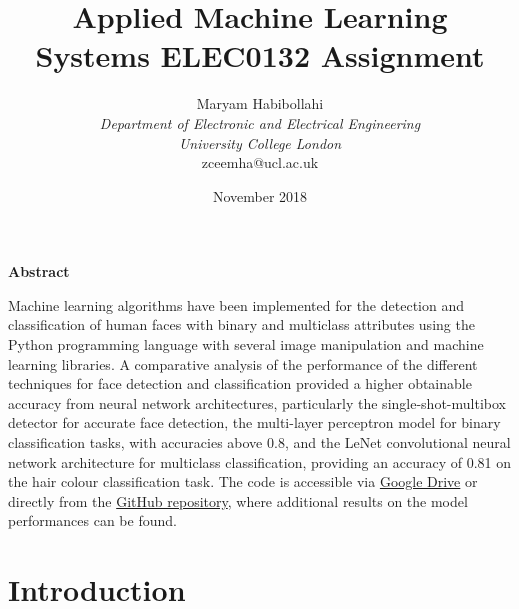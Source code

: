 \documentclass[conference]{IEEEtran}
\begin{document}
\def\code#1{\texttt{#1}}

\title{Applied Machine Learning\\
 Systems ELEC0132 Assignment}
\author{\large Maryam Habibollahi\\ \textit{Department of Electronic and Electrical Engineering}\\ \textit{University College London}\\ zceemha@ucl.ac.uk}
\date{November 2018}
\maketitle

\setcounter{page}{1} 

\begin{center} \large \textbf{Abstract} \end{center}

Machine learning algorithms have been implemented for the detection and classification of human faces with binary and multiclass attributes using the Python programming language with several image manipulation and machine learning libraries. A comparative analysis of the performance of the different techniques for face detection and classification provided a higher obtainable accuracy from neural network architectures, particularly the single-shot-multibox detector for accurate face detection, the multi-layer perceptron model for binary classification tasks, with accuracies above 0.8, and the LeNet convolutional neural network architecture for multiclass classification, providing an accuracy of 0.81 on the hair colour classification task. The code is accessible via  \href{https://drive.google.com/file/d/1WXVxgsFRLl0BnZnKn3MUFrzJA3oxCLS6/view?usp=sharing}{Google Drive} or directly from the  \href{https://github.com/maryamhb/AMLSassignment}{GitHub repository}, where additional results on the model performances can be found.

\section{Introduction} \label{s-intro}

\end{document}
